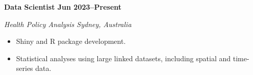 \textbf{Data Scientist \hfill Jun 2023--Present}\par
\textit{Health Policy Analysis \hfill Sydney, Australia}\par
\begin{itemize}
	\item Shiny and R package development.
	\item Statistical analyses using large linked datasets, including spatial and time-series data.
\end{itemize}\par